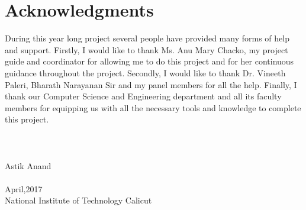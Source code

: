 \cleardoublepage
{}
{}
\chapter*{Acknowledgments}
\vspace{1.0in}
During  this  year  long  project  several  people  have  provided  many  forms  of  help  and  support.  Firstly, I would  like  to  thank  Ms. Anu Mary Chacko, my project guide and coordinator for  allowing me to  do  this  project  and  for her continuous  guidance  throughout  the  project. Secondly, I would like to thank Dr. Vineeth Paleri, Bharath Narayanan Sir and my panel members for all the help. Finally, I thank our Computer Science and Engineering department and all its faculty members for equipping us with all the necessary tools and knowledge to complete this project.
\\
\\
\\ 
\\
Astik Anand \\
\\
April,2017\\
{National Institute of Technology Calicut}\\
\newpage
